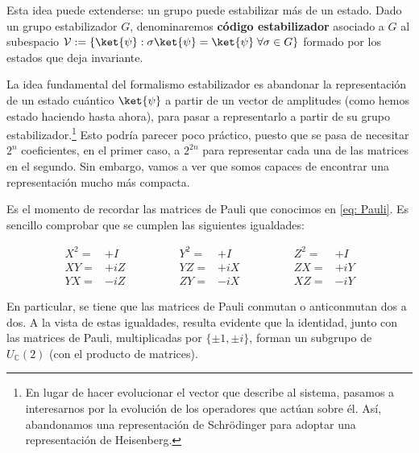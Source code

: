 \documentclass[11pt,a4paper,twoside,pdf]{article}
\numberwithin{equation}{section}
\begin{document}
		Esta idea puede extenderse: un grupo puede estabilizar más de un estado. Dado un grupo estabilizador $G$, denominaremos \textbf{código estabilizador} asociado a $G$ al subespacio $\mathcal{V}:= \{ \ket{\psi} : \sigma\ket{\psi}=\ket{\psi} \; \forall \sigma \in G \}$ formado por los estados que deja invariante.
	
		La idea fundamental del formalismo estabilizador es abandonar la representación de un estado cuántico $\ket{\psi}$ a partir de un vector de amplitudes (como hemos estado haciendo hasta ahora), para pasar a representarlo a partir de su grupo estabilizador.\footnote{En lugar de hacer evolucionar el vector que describe al sistema, pasamos a interesarnos por la evolución de los operadores que actúan sobre él. Así, abandonamos una representación de Schrödinger para adoptar una representación de Heisenberg.} Esto podría parecer poco práctico, puesto que se pasa de necesitar $2^n$ coeficientes, en el primer caso, a $2^{2n}$ para representar cada una de las matrices en el segundo. Sin embargo, vamos a ver que somos capaces de encontrar una representación mucho más compacta. 
		
		Es el momento de recordar las matrices de Pauli que conocimos en \ref{eq: Pauli}. Es sencillo comprobar que se cumplen las siguientes igualdades:
	
			\begin{equation} \label{eq: Pauli igualdades}
				\begin{aligned} X^2 = & +I \\ XY = & +iZ \\  YX = & -iZ \end{aligned}
													\qquad \qquad		
				\begin{aligned} Y^2 = & +I \\ YZ = & +iX \\  ZY = & -iX \end{aligned}
													\qquad \qquad
				\begin{aligned} Z^2 = & +I \\ ZX = & +iY \\  XZ = & -iY \end{aligned}
			\end{equation}
	
		En particular, se tiene que las matrices de Pauli conmutan o anticonmutan dos a dos. A la vista de estas igualdades, resulta evidente que la identidad, junto con las matrices de Pauli, multiplicadas por $\{\pm1,\pm i\}$, forman un subgrupo de $U_\mathbb{C}(2)$ (con el producto de matrices).
	
\end{document}

